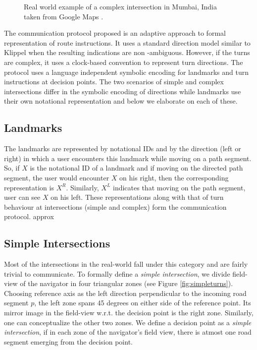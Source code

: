 \documentclass{iitkthesis}
\begin{document}
 \begin{figure}[htb]
\centering
\caption{Real world example of a complex intersection in Mumbai, India 
taken from Google Maps \cite{gmaps}.}
\label{fig:complex_real}
 \end{figure}

The communication protocol proposed is an adaptive approach to formal 
representation of route instructions. It uses a standard direction model 
similar to Klippel \cite{klippel} when the resulting indications are non
-ambiguous. However, if the turns are complex, it uses a clock-based 
convention to represent turn directions. The protocol uses a language 
independent symbolic encoding for landmarks and turn instructions at 
decision points. The two scenarios of simple and complex intersections 
differ in the symbolic encoding of directions while landmarks use their own 
notational representation and below we elaborate on each of these. 

\subsection{Landmarks}
The landmarks are represented by notational IDs and by the direction 
(left or right) in which a user encounters this landmark while moving on 
a path segment. So, if $X$ is the notational ID of a landmark and if 
moving on the directed path segment, the user would encounter $X$ on his 
right, then the corresponding representation is $X^R$. Similarly, $X^L$ 
indicates that moving on the path segment, user can see $X$ on his left. 
These representations along with that of turn behaviour at intersections 
(simple and complex) form the communication protocol. approx

\subsection{Simple Intersections}
Most of the intersections in the real-world fall under this category and 
are fairly trivial to communicate. To formally define a \textit{simple 
intersection}, we divide field-view of the navigator in four triangular 
zones (see Figure \ref{fig:simpleturns}). Choosing reference axis as the 
left direction perpendicular to the incoming road segment $p$, the left 
zone spans 45 degrees on either side of the reference point. Its mirror 
image in the field-view w.r.t. the decision point is the right zone. 
Similarly, one can conceptualize the other two zones. We define a 
decision point as a \textit{simple intersection}, if in each zone of the 
navigator's field view, there is atmost one road segment emerging from 
the decision point. 
\end{document}
